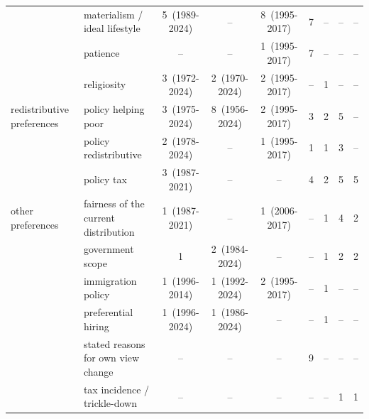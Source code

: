 \documentclass[11pt, headsepline]{article}
\begin{document}
\begin{landscape}
\begin{longtable}{@{}l p{2.6in} ccc cccc@{}}
 & materialism / ideal lifestyle & 5~(1989-2024) & \textcolor[gray]{0.62}{--} & 8~(1995-2017) & 7 & \textcolor[gray]{0.62}{--} & \textcolor[gray]{0.62}{--} & \textcolor[gray]{0.62}{--} \\
 & patience & \textcolor[gray]{0.62}{--} & \textcolor[gray]{0.62}{--} & 1~(1995-2017) & 7 & \textcolor[gray]{0.62}{--} & \textcolor[gray]{0.62}{--} & \textcolor[gray]{0.62}{--} \\
 & religiosity & 3~(1972-2024) & 2~(1970-2024) & 2~(1995-2017) & \textcolor[gray]{0.62}{--} & 1 & \textcolor[gray]{0.62}{--} & \textcolor[gray]{0.62}{--} \\
\addlinespace[3pt]\midrule\addlinespace[3pt]
redistributive preferences & policy helping poor & 3~(1975-2024) & 8~(1956-2024) & 2~(1995-2017) & 3 & 2 & 5 & \textcolor[gray]{0.62}{--} \\
 & policy redistributive & 2~(1978-2024) & \textcolor[gray]{0.62}{--} & 1~(1995-2017) & 1 & 1 & 3 & \textcolor[gray]{0.62}{--} \\
 & policy tax & 3~(1987-2021) & \textcolor[gray]{0.62}{--} & \textcolor[gray]{0.62}{--} & 4 & 2 & 5 & 5 \\
\addlinespace[2pt]
other preferences & fairness of the current distribution & 1~(1987-2021) & \textcolor[gray]{0.62}{--} & 1~(2006-2017) & \textcolor[gray]{0.62}{--} & 1 & 4 & 2 \\
 & government scope & 1 & 2~(1984-2024) & \textcolor[gray]{0.62}{--} & \textcolor[gray]{0.62}{--} & 1 & 2 & 2 \\
 & immigration policy & 1~(1996-2014) & 1~(1992-2024) & 2~(1995-2017) & \textcolor[gray]{0.62}{--} & 1 & \textcolor[gray]{0.62}{--} & \textcolor[gray]{0.62}{--} \\
 & preferential hiring & 1~(1996-2024) & 1~(1986-2024) & \textcolor[gray]{0.62}{--} & \textcolor[gray]{0.62}{--} & 1 & \textcolor[gray]{0.62}{--} & \textcolor[gray]{0.62}{--} \\
 & stated reasons for own view change & \textcolor[gray]{0.62}{--} & \textcolor[gray]{0.62}{--} & \textcolor[gray]{0.62}{--} & 9 & \textcolor[gray]{0.62}{--} & \textcolor[gray]{0.62}{--} & \textcolor[gray]{0.62}{--} \\
 & tax incidence / trickle-down & \textcolor[gray]{0.62}{--} & \textcolor[gray]{0.62}{--} & \textcolor[gray]{0.62}{--} & \textcolor[gray]{0.62}{--} & \textcolor[gray]{0.62}{--} & 1 & 1 \\
\bottomrule
\end{longtable}

\end{landscape}
\end{document}
